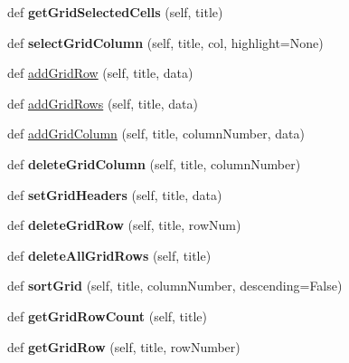 \begin{DoxyCompactItemize}
def {\bfseries get\+Grid\+Selected\+Cells} (self, title)
\item 
\mbox{\label{classappjar_1_1gui_ae56786a0ef8163d4d6ff38b7e8bffc87}} 
def {\bfseries select\+Grid\+Column} (self, title, col, highlight=None)
\item 
def \hyperlink{classappjar_1_1gui_a9472f1b4945164bfc7f224fa83c49c41}{add\+Grid\+Row} (self, title, data)
\item 
def \hyperlink{classappjar_1_1gui_a0a0918e83cbbe41c78e46b5d17ad32ee}{add\+Grid\+Rows} (self, title, data)
\item 
def \hyperlink{classappjar_1_1gui_ad43b2e5b2a830398124aa50cc8458192}{add\+Grid\+Column} (self, title, column\+Number, data)
\item 
\mbox{\label{classappjar_1_1gui_a33e21ecdcea30dcba6e6f128b7ab3179}} 
def {\bfseries delete\+Grid\+Column} (self, title, column\+Number)
\item 
\mbox{\label{classappjar_1_1gui_abf3ee5dfcd818cce27b2c446683b673f}} 
def {\bfseries set\+Grid\+Headers} (self, title, data)
\item 
\mbox{\label{classappjar_1_1gui_a249e95e6f6d04735e348bd15a257c10e}} 
def {\bfseries delete\+Grid\+Row} (self, title, row\+Num)
\item 
\mbox{\label{classappjar_1_1gui_a460e6a7e6f9bc044b49058dea6d6ee20}} 
def {\bfseries delete\+All\+Grid\+Rows} (self, title)
\item 
\mbox{\label{classappjar_1_1gui_aecd832fcdcf4a7730144ca58c756b03e}} 
def {\bfseries sort\+Grid} (self, title, column\+Number, descending=False)
\item 
\mbox{\label{classappjar_1_1gui_a25898f5412228ce26c8cb6196d95e904}} 
def {\bfseries get\+Grid\+Row\+Count} (self, title)
\item 
\mbox{\label{classappjar_1_1gui_a561dde6a38c7c907114d2e86230478c7}} 
def {\bfseries get\+Grid\+Row} (self, title, row\+Number)
\item 
\mbox{\label{classappjar_1_1gui_a01939e0da8db58e14ff2dfcd4dfec820}} 

\end{DoxyCompactItemize}
